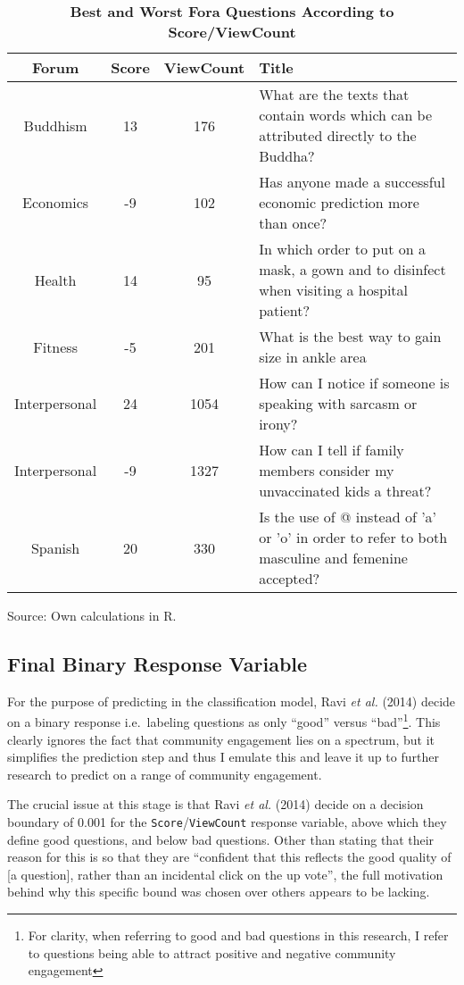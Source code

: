 \documentclass[12pt,preprint, authoryear]{article}
\numberwithin{equation}{section}
\numberwithin{figure}{section}
\numberwithin{table}{section}
\let\rmarkdownfootnote\footnote%
\def\footnote{\protect\rmarkdownfootnote}
\begin{document}
\begin{longtable} {@{} cccp{11cm} @{}}
\caption{\textbf{Best and Worst Fora Questions According to Score/ViewCount}}
\label{tab:bestworst}\\ \hline \hline
\textbf{Forum} & \textbf{Score} & \textbf{ViewCount} & \textbf{Title} \\ 
\hline
Buddhism & 13 & 176 & What are the texts that contain words which can be attributed directly to the Buddha? \\
\hline
Economics & -9 & 102 & Has anyone made a successful economic prediction more than once? \\
\hline
Health & 14 & 95 & In which order to put on a mask, a gown and to disinfect when visiting a hospital patient? \\ 
\hline
Fitness & -5 & 201 & What is the best way to gain size in ankle area \\ 
\hline
Interpersonal & 24 & 1054 & How can I notice if someone is speaking with sarcasm or irony? \\ 
\hline
Interpersonal & -9 & 1327 & How can I tell if family members consider my unvaccinated kids a threat? \\ 
\hline
Spanish & 20 & 330 & Is the use of @ instead of 'a' or 'o' in order to refer to both masculine and femenine accepted? \\ 
\hline \hline
\end{longtable}\begin{center} Source: Own calculations in R.\end{center}

\normalsize

\subsection{Final Binary Response
Variable}\label{final-binary-response-variable}

For the purpose of predicting in the classification model, Ravi \emph{et
al.} (2014) decide on a binary response i.e.~labeling questions as only
``good'' versus
``bad''\footnote{For clarity, when referring to good and bad questions in this research, I refer to questions being able to attract positive and negative community engagement}.
This clearly ignores the fact that community engagement lies on a
spectrum, but it simplifies the prediction step and thus I emulate this
and leave it up to further research to predict on a range of community
engagement.

The crucial issue at this stage is that Ravi \emph{et al.} (2014) decide
on a decision boundary of 0.001 for the
\texttt{Score}/\texttt{ViewCount} response variable, above which they
define good questions, and below bad questions. Other than stating that
their reason for this is so that they are ``confident that this reflects
the good quality of {[}a question{]}, rather than an incidental click on
the up vote'', the full motivation behind why this specific bound was
chosen over others appears to be lacking.
\end{document}
